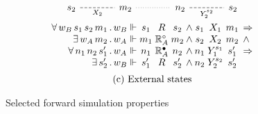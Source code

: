 \documentclass[sigplan,screen]{acmart}
\newcommand{\que}{\circ}
\newcommand{\ans}{\bullet}
\begin{document}
\begin{figure}
\[\begin{array}{c}
\begin{tikzcd}[sep=large,baseline=-3pt]
        s_2 \ar[r, "X_2"', dash, dashed] &
        m_2 \ar[r, dotted, dash] &
        n_2 \ar[r, "Y_2^{s_2}"', dash, dashed] &
        s_2
      \end{tikzcd}
      \vspace{0.5ex} \\
      \begin{array}{
          r @{\,.\,} l @{{} \Vdash {}} c@{}c@{}c @{\:\wedge\:}
                                    c@{}c@{}c @{\:\:} l}
        \forall \, w_B \, s_1 \, s_2 \, m_1 & w_B & s_1 & {}\mathrel{R}{} & s_2 &
                        s_1 & {}\mathrel{X_1}{} & m_1 & \Rightarrow \\
        \exists \, w_A \, m_2 & w_A & m_1 & {}\mathrel{\mathbb{R}_A^\que}{} & m_2 &
                        s_2 & {}\mathrel{X_2}{} & m_2 & \wedge \\
        \forall \, n_1 \, n_2 \, s_1' & w_A & n_1 & {}\mathrel{\mathbb{R}_A^\ans}{} & n_2 &
                        n_1 & {}\mathrel{Y_1^{s_1}}{} & s_1' & \Rightarrow \\
        \exists \, s_2' & w_B & s_1' & {}\mathrel{R}{} & s_2' &
                        n_2 & {}\mathrel{Y_2^{s_2}}{} & s_2' &
      \end{array}
      \vspace{1.2ex} \\
      \text{(c) External states}
    \end{array}
  \]
  \caption{Selected forward simulation properties}
  \label{fig:fsim}
\end{figure}
\end{document}
